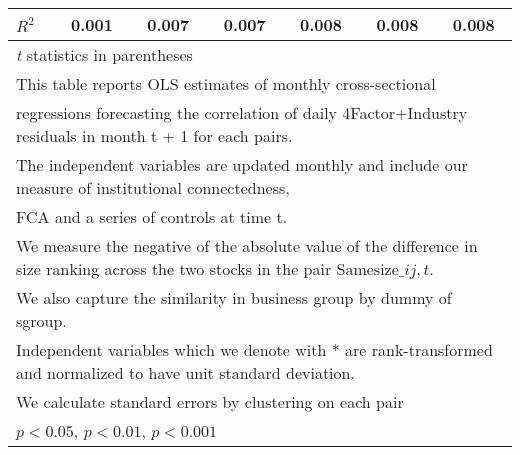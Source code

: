 {\begin{tabular}{l*{6}{c}}
\(R^{2}\)           &       0.001         &       0.007         &       0.007         &       0.008         &       0.008         &       0.008         \\
\hline\hline
\multicolumn{7}{l}{\footnotesize \textit{t} statistics in parentheses}\\
\multicolumn{7}{l}{\footnotesize This table reports OLS estimates of monthly cross-sectional}\\
\multicolumn{7}{l}{\footnotesize  regressions forecasting the correlation of daily 4Factor+Industry residuals in month t + 1 for each pairs.}\\
\multicolumn{7}{l}{\footnotesize The independent variables are updated monthly and include our measure of institutional connectedness,}\\
\multicolumn{7}{l}{\footnotesize  FCA and a series of controls at time t.}\\
\multicolumn{7}{l}{\footnotesize We measure the negative of the absolute value of the difference in size ranking across the two stocks in the pair $ \text{Samesize}\_{ij,t} $.}\\
\multicolumn{7}{l}{\footnotesize We also capture the similarity in business group by dummy of sgroup.}\\
\multicolumn{7}{l}{\footnotesize Independent variables which  we denote with * are rank-transformed and normalized to have unit standard deviation.}\\
\multicolumn{7}{l}{\footnotesize  We calculate standard errors by clustering on each pair}\\
\multicolumn{7}{l}{\footnotesize \sym{*} \(p<0.05\), \sym{**} \(p<0.01\), \sym{***} \(p<0.001\)}\\
\end{tabular}
}
